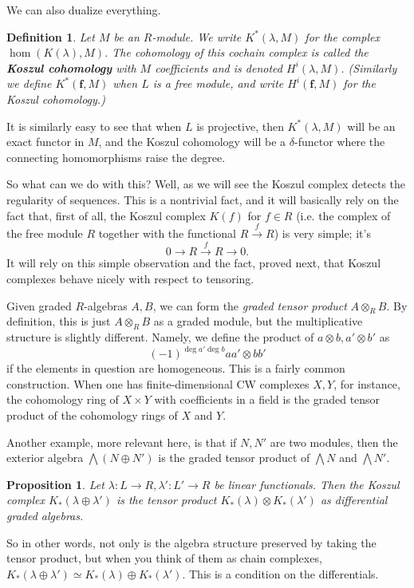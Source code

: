 \documentclass{article}
\newtheorem{definition}{Definition}
\newtheorem{proposition}{Proposition}
\begin{document}
We can also dualize everything. 
\begin{definition} 
Let $M$ be an $R$-module. We write $K^*(\lambda, M)$ for the complex
$\hom(K(\lambda), M)$. The cohomology of this cochain complex is called the
\textbf{Koszul cohomology} with $M$ coefficients and is denoted $H^i(\lambda,
M)$. (Similarly we define
$K^*(\mathbf{f}, M)$ when $L$ is a free module, and write $H^i(\mathbf{f}, M)$
for the Koszul cohomology.)
\end{definition} 

It is similarly easy to see that when $L$ is projective, then $K^*(\lambda, M)$
will be an exact functor in $M$, and the Koszul 
cohomology will be a $\delta$-functor where the connecting homomorphisms raise
the degree. 


So what can we do with this? Well, as we will see the Koszul complex detects
the regularity of sequences. This is a nontrivial fact, and it will basically
rely on the fact that, first of all, the Koszul complex $K(f)$ for $f \in R$
(i.e. the complex of the free module $R$ together with the functional $R
\stackrel{f}{\to} R$) is very simple; it's
\[ 0 \to R \stackrel{f}{\to} R \to 0.  \]
It will rely on this simple observation and the fact, proved next, that Koszul
complexes behave nicely with respect to tensoring.

Given graded $R$-algebras $A, B$, we can form the \emph{graded tensor product} $A
\otimes_R B$. By definition, this is just $A \otimes_R B$ as a graded module,
but the multiplicative structure is slightly different. Namely, we define the
product of $a \otimes b, a' \otimes b'$ as 
\[ (-1)^{\deg a' \deg b} aa' \otimes bb'  \]
if the elements in question are homogeneous. This is a fairly common
construction. When one has finite-dimensional CW
complexes $X,Y$, for instance, the cohomology ring of $X \times Y$ with
coefficients in a field is the graded tensor product of the cohomology rings of
$X$ and $Y$. 

Another example, more relevant here, is that if $N,N'$ are two modules, then
the exterior algebra $\bigwedge (N \oplus N')$ is the graded tensor product of
$\bigwedge N $ and $\bigwedge N'$. 

\begin{proposition} 
Let $\lambda: L \to R, \lambda': L' \to R$ be linear functionals. Then the
Koszul complex $K_*(\lambda \oplus \lambda')$ is the tensor product
$K_*(\lambda) \otimes K_*(\lambda')$ as differential graded algebras.
\end{proposition} 
So in other words, not only is the algebra structure preserved by taking the
tensor product, but when you think of them as chain complexes, $K_*(\lambda
\oplus \lambda') \simeq K_*(\lambda) \oplus K_*(\lambda')$. This is a condition
on the differentials.
\end{document}
